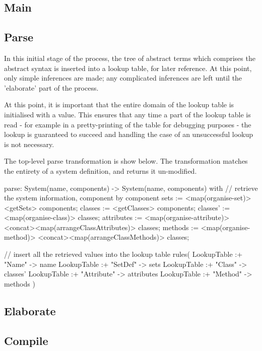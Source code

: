 \subsection{Main}

\subsection{Parse}

In this initial stage of the process, the tree of abstract terms which
comprises the abstract syntax is inserted into a lookup table, for
later reference.  At this point, only simple inferences are made; any
complicated inferences are left until the 'elaborate' part of the
process.

At this point, it is important that the entire domain of the lookup
table is initialised with a value. This ensures that any time a part
of the lookup table is read - for example in a pretty-printing of the
table for debugging purposes - the lookup is guaranteed to succeed and
handling the case of an unsuccessful lookup is not necessary.

The top-level parse transformation is show below.  The transformation
matches the entirety of a system definition, and returns it
un-modified.


\begin{code}
parse: 
  System(name, components) -> 
    System(name, components)
  with  
    // retrieve the system information, component by component 
    sets := <map(organise-set)> <getSets> components;
    classes := <getClasses> components;
    classes' := <map(organise-class)> classes;
    attributes := <map(organise-attribute)>
                    <concat><map(arrangeClassAttributes)> classes;
    methods := <map(organise-method)>
                    <concat><map(arrangeClassMethods)> classes;

    // insert all the retrieved values into the lookup table
    rules(
      LookupTable :+ "Name" ->  name
      LookupTable :+ "SetDef" -> sets 
      LookupTable :+ "Class" ->  classes'
      LookupTable :+ "Attribute" ->  attributes
      LookupTable :+ "Method" ->  methods
    )
\end{code}



\subsection{Elaborate}
\subsection{Compile}
